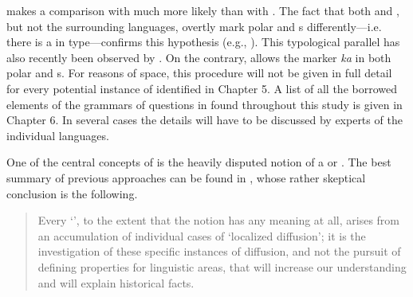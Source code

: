  makes a comparison with  much more likely than with . The fact that both  and , but not the surrounding languages, overtly mark polar and s differently---i.e. there is a  in type---confirms this hypothesis (e.g., \citealt{Hölzl2015b}). This typological parallel has also recently been observed by \citet[59f.]{Pevnov2016}. On the contrary,  allows the marker \textit{ka} in both polar and s. For reasons of space, this procedure will not be given in full detail for every potential instance of  identified in Chapter 5. A list of all the borrowed elements of the grammars of questions in  found throughout this study is given in Chapter 6. In several cases the details will have to be discussed by experts of the individual languages.

One of the central concepts of  is the heavily disputed notion of a \textit{} or \textit{}. The best summary of previous approaches can be found in \citet[18]{Campbell2006}, whose rather skeptical conclusion is the following.

\begin{quote}
Every ‘’, to the extent that the notion has any meaning at all, arises from an accumulation of individual cases of ‘localized diffusion’; it is the investigation of these specific instances of diffusion, and not the pursuit of defining properties for linguistic areas, that will increase our understanding and will explain historical facts.
\end{quote}

